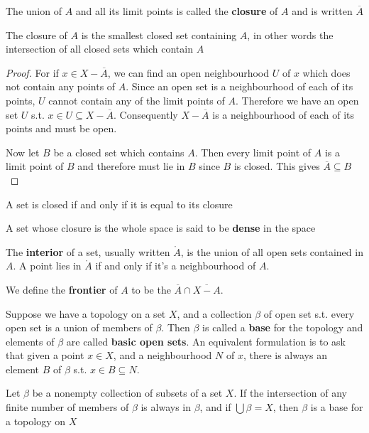 \documentclass[11pt]{article}
\begin{document}
The union of \(A\) and all its limit points is called the \textbf{closure} of \(A\)
and is written \(\overbar{A}\)

\begin{theorem}[]
The closure of \(A\) is the smallest closed set containing \(A\), in other
words the intersection of all closed sets which contain \(A\)
\end{theorem}

\begin{proof}
For if \(x\in X-\overbar{A}\), we can find an open neighbourhood \(U\) of \(x\)
which does not contain any points of \(A\). Since an open set is a
neighbourhood of each of its points, \(U\) cannot contain any of the limit
points of \(A\). Therefore we have an open set \(U\) s.t.
\(x\in U\subseteq X-\overbar{A}\). Consequently \(X-\overbar{A}\) is a
neighbourhood of each of its points and must be open.

Now let \(B\) be a closed set which contains \(A\). Then every limit point of
\(A\) is a limit point of \(B\) and therefore must lie in \(B\) since \(B\)
is closed. This gives \(\overbar{A}\subseteq B\)
\end{proof}

\begin{corollary}[]
A set is closed if and only if it is equal to its closure
\end{corollary}

A set whose closure is the whole space is said to be \textbf{dense} in the space

The \textbf{interior} of a set, usually written \(\mathring{A}\), is the union of
all open sets contained in \(A\). A point lies in \(\mathring{A}\) if and
only if it's a neighbourhood of \(A\).

We define the \textbf{frontier} of \(A\) to be the \(\overbar{A}\cap\overbar{X-A}\).

Suppose we have a topology on a set \(X\), and a collection \(\beta\) of open set
s.t. every open set is a union of members of \(\beta\). Then \(\beta\) is called a
\textbf{base} for the topology and elements of \(\beta\) are called \textbf{basic open sets}.
An equivalent formulation is to ask that given a point \(x\in X\), and a
neighbourhood \(N\) of \(x\), there is always an element \(B\) of \(\beta\) s.t.
\(x\in B\subseteq N\).

\begin{theorem}[]
Let \(\beta\) be a nonempty collection of subsets of a set \(X\). If the
intersection of any finite number of members of \(\beta\) is always in \(\beta\), and
if \(\bigcup\beta=X\), then \(\beta\) is a base for a topology on \(X\)
\end{theorem}
\end{document}
